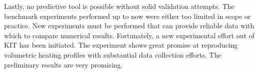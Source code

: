 Lastly, no predictive tool is possible without solid validation attempts. The benchmark experiments performed up to now were either too limited in scope or practice. New experiments must be performed that can provide reliable data with which to compare numerical results. Fortunately, a new experimental effort out of KIT has been initiated.\cite{Hernandez2014} The experiment shows great promise at reproducing volumetric heating profiles with substantial data collection efforts. The preliminary results are very promising.


